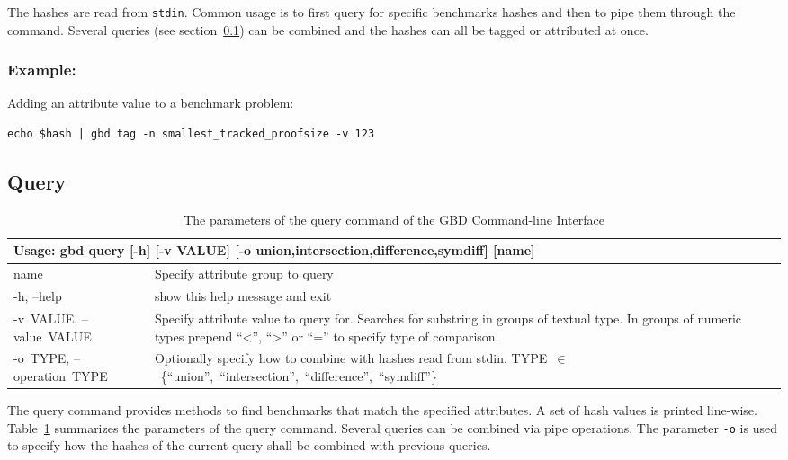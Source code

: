 \documentclass{easychair}
\begin{document}
The hashes are read from \texttt{stdin}. 
Common usage is to first query for specific benchmarks hashes and then to pipe them through the command.
Several queries (see section~\ref{cli:query}) can be combined and the hashes can all be tagged or attributed at once.

\subsubsection{Example:} Adding an attribute value to a benchmark problem:
\begin{verbatim}
echo $hash | gbd tag -n smallest_tracked_proofsize -v 123 
\end{verbatim}


\subsection{Query}
\label{cli:query}

\begin{table}[ht]
\begin{tabular}{p{.23\linewidth}|p{.73\linewidth}}
\multicolumn{2}{l}{\bf Usage: \textsf{gbd query [-h] [-v VALUE]
                    [-o {union,intersection,difference,symdiff}]
                    [name]}}\\

\hline
  \sf name                  &Specify attribute group to query\\

  \sf -h, --help            &show this help message and exit\\
  \sf \mbox{-v VALUE}, \mbox{--value VALUE}
                        &Specify attribute value to query for. Searches for
                        substring in groups of textual type. In groups of
                        numeric types prepend \textsf{``<'', ``>'' or ``=''} to specify type
                        of comparison.\\
  \sf \mbox{-o TYPE}, \mbox{--operation TYPE}
  			            &Optionally specify how to combine with hashes read
                        from \textsf{stdin}. \mbox{\textsf{TYPE $\in$ \{``union'', ``intersection'', ``difference'', ``symdiff''\}}}
\end{tabular}
\caption{The parameters of the query command of the GBD Command-line Interface}
\label{fig:cli:query}
\end{table}

The query command provides methods to find benchmarks that match the specified attributes. 
A set of hash values is printed line-wise. 
Table~\ref{fig:cli:query} summarizes the parameters of the query command.
Several queries can be combined via pipe operations. 
The parameter \texttt{-o} is used to specify how the hashes of the current query shall be
combined with previous queries. 
\end{document}
